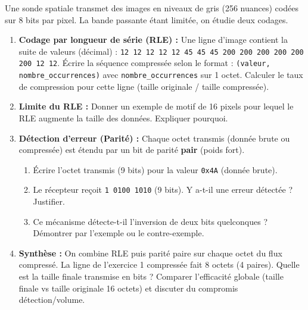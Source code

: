 \documentclass[11pt]{article}
\begin{document}
\begin{exercice}
Une sonde spatiale transmet des images en niveaux de gris (256 nuances) codées sur 8 bits par pixel. La bande passante étant limitée, on étudie deux codages.
\begin{enumerate}
    \item \textbf{Codage par longueur de série (RLE) :} Une ligne d'image contient la suite de valeurs (décimal) : 
    \texttt{12 12 12 12 12 45 45 45 200 200 200 200 200 200 12 12}.
    Écrire la séquence compressée selon le format : \texttt{(valeur, nombre\_occurrences)} avec \texttt{nombre\_occurrences} sur 1 octet. Calculer le taux de compression pour cette ligne (taille originale / taille compressée).
    \item \textbf{Limite du RLE :} Donner un exemple de motif de 16 pixels pour lequel le RLE augmente la taille des données. Expliquer pourquoi.
    \item \textbf{Détection d'erreur (Parité) :} Chaque octet transmis (donnée brute ou compressée) est étendu par un bit de parité \textbf{pair} (poids fort).
    \begin{enumerate}
        \item Écrire l'octet transmis (9 bits) pour la valeur \texttt{0x4A} (donnée brute).
        \item Le récepteur reçoit \texttt{1 0100 1010} (9 bits). Y a-t-il une erreur détectée ? Justifier.
        \item Ce mécanisme détecte-t-il l'inversion de deux bits quelconques ? Démontrer par l'exemple ou le contre-exemple.
    \end{enumerate}
    \item \textbf{Synthèse :} On combine RLE puis parité paire sur chaque octet du flux compressé. La ligne de l'exercice 1 compressée fait 8 octets (4 paires). Quelle est la taille finale transmise en bits ? Comparer l'efficacité globale (taille finale vs taille originale 16 octets) et discuter du compromis détection/volume.
\end{enumerate}
\end{exercice}
\end{document}
